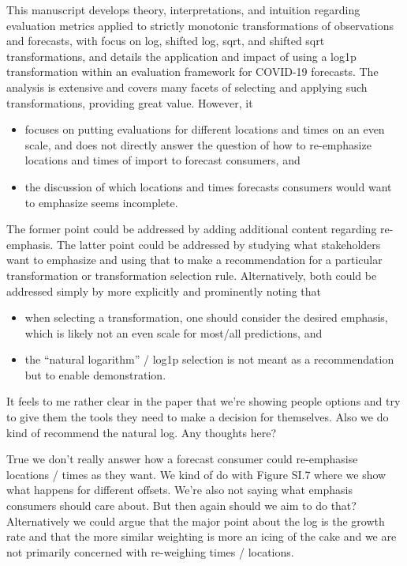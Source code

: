 \documentclass{article}
\newcommand{\black}{\color{black}}
\begin{document}
This manuscript develops theory, interpretations, and intuition regarding evaluation metrics applied to strictly monotonic transformations of observations and forecasts, with focus on log, shifted log, sqrt, and shifted sqrt transformations, and details the application and impact of using a log1p transformation within an evaluation framework for COVID-19 forecasts.
The analysis is extensive and covers many facets of selecting and applying such transformations, providing great value. However, it
\begin{itemize}
    \item focuses on putting evaluations for different locations and times on an even scale, and does not directly answer the question of how to re-emphasize locations and times of import to forecast consumers, and
    \item the discussion of which locations and times forecasts consumers would want to emphasize seems incomplete.
\end{itemize}
The former point could be addressed by adding additional content regarding re-emphasis. The latter point could be addressed by studying what stakeholders want to emphasize and using that to make a recommendation for a particular transformation or transformation selection rule. Alternatively, both could be addressed simply by more explicitly and prominently noting that
\begin{itemize}
    \item when selecting a transformation, one should consider the desired emphasis, which is likely not an even scale for most/all predictions, and
    \item the “natural logarithm” / log1p selection is not meant as a recommendation but to enable demonstration.
\end{itemize}

\black
It feels to me rather clear in the paper that we're showing people options and try to give them the tools they need to make a decision for themselves. Also we do kind of recommend the natural log. Any thoughts here? 

True we don't really answer how a forecast consumer could re-emphasise locations / times as they want. We kind of do with Figure SI.7 where we show what happens for different offsets. We're also not saying what emphasis consumers should care about. But then again should we aim to do that? 
Alternatively we could argue that the major point about the log is the growth rate and that the more similar weighting is more an icing of the cake and we are not primarily concerned with re-weighing times / locations. 
\end{document}
